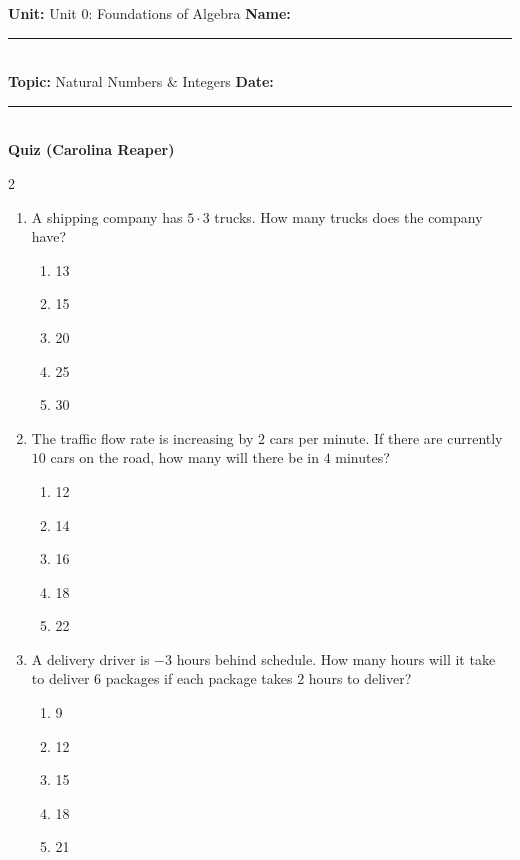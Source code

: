 \documentclass[10pt]{article}
\begin{document}
\enlargethispage{2.5cm}

\begin{tcolorbox}[colback=mainblue!5, colframe=mainblue, sharp corners, boxrule=0.5pt]
    \small \textbf{Unit:} Unit 0: Foundations of Algebra \hfill \textbf{Name:} \rule{3cm}{0.4pt} \\
    \small \textbf{Topic:} Natural Numbers & Integers \hfill \textbf{Date:} \rule{2cm}{0.4pt} \\
    \centering \textbf{\large Quiz (Carolina Reaper)}
\end{tcolorbox}

\vspace{0.2cm}

\begin{multicols}{2}
\begin{enumerate}[label=\textbf{Q\arabic*.}, leftmargin=*, itemsep=6pt, parsep=0pt]

  \item \small A shipping company has $5 \cdot 3$ trucks. How many trucks does the company have?
  \begin{enumerate}[label=(\Alph*), leftmargin=0.6cm, nosep, itemsep=2pt]
    \item 13
    \item 15
    \item 20
    \item 25
    \item 30
  \end{enumerate}

  \item \small The traffic flow rate is increasing by $2$ cars per minute. If there are currently $10$ cars on the road, how many will there be in $4$ minutes?
  \begin{enumerate}[label=(\Alph*), leftmargin=0.6cm, nosep, itemsep=2pt]
    \item 12
    \item 14
    \item 16
    \item 18
    \item 22
  \end{enumerate}

  \item \small A delivery driver is $-3$ hours behind schedule. How many hours will it take to deliver $6$ packages if each package takes $2$ hours to deliver?
  \begin{enumerate}[label=(\Alph*), leftmargin=0.6cm, nosep, itemsep=2pt]
    \item 9
    \item 12
    \item 15
    \item 18
    \item 21
  \end{enumerate}


\end{enumerate}
\end{multicols}
\end{document}
